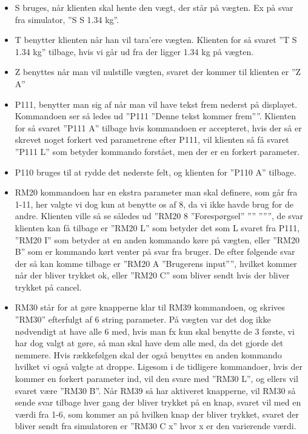 \documentclass[a4paper]{article}
\begin{document}
\begin{itemize}
  \item	S bruges, når klienten skal hente den vægt, der står på vægten. Ex på svar fra simulator, ”S S       1.34 kg”.

  \item	T benytter klienten når han vil tara’ere vægten. Klienten for så svaret ”T S       1.34 kg” tilbage, hvis vi går ud fra der ligger 1.34 kg på vægten.

  \item Z benyttes når man vil nulstille vægten, svaret der kommer til klienten er ”Z A”

  \item P111, benytter man sig af når man vil have tekst frem nederst på displayet. Kommandoen ser så ledes ud ”P111 ”Denne tekst kommer frem””. Klienten for så svaret ”P111 A” tilbage hvis kommandoen er accepteret, hvis der så er skrevet noget forkert ved parametrene efter P111, vil klienten så få svaret ”P111 L” som betyder kommando forstået, men der er en forkert parameter.

  \item	P110 bruges til at rydde det nederste felt, og klienten for ”P110 A” tilbage.

  \item RM20 kommandoen har en ekstra parameter man skal definere, som går fra 1-11, her valgte vi dog kun at benytte os af 8, da vi ikke havde brug for de andre. Klienten ville så se således ud 
  ”RM20 8 ”Forespørgsel” ”” ”””, de svar klienten kan få tilbage er ”RM20 L” som betyder det som L svaret fra P111, ”RM20 I” som betyder at en anden kommando køre på vægten, eller ”RM20 B” som er kommando kørt venter på svar fra bruger. De efter følgende svar der så kan komme tilbage er ”RM20 A ”Brugerens input””, hvilket kommer når der bliver trykket ok, eller ”RM20 C” som bliver sendt hvis der bliver trykket på cancel.

  \item	RM30 står for at gøre knapperne klar til RM39 kommandoen, og skrives ”RM30” efterfulgt af 6 string parameter. På vægten var det dog ikke nødvendigt at have alle 6 med, hvis man fx kun skal benytte de 3 første, vi har dog valgt at gøre, så man skal have dem alle med, da det gjorde det nemmere. Hvis rækkefølgen skal der også benyttes en anden kommando hvilket vi også valgte at droppe. Ligesom i de tidligere kommandoer, hvis der kommer en forkert parameter ind, vil den svare med ”RM30 L”, og ellers vil svaret være ”RM30 B”. Når RM39 så har aktiveret knapperne, vil RM30 så sende svar tilbage hver gang der bliver trykket på en knap, svaret vil med en værdi fra 1-6, som kommer an på hvilken knap der bliver trykket, svaret der bliver sendt fra simulatoren er ”RM30 C x” hvor x er den varierende værdi.


\end{itemize}
\end{document}
